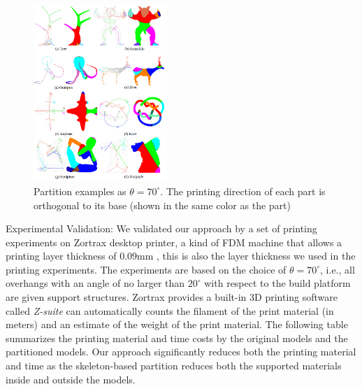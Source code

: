 \begin{figure}[tbp]
  \centering
  \includegraphics[width=0.45\textwidth]{figs/programming.png}
  \caption{\label{fig:programming}%
           Partition examples as $\theta = 70^{\circ}$. The printing direction of each part is orthogonal to its base (shown in the same color as the part)}
\end{figure}

Experimental Validation: We validated our approach by a set of printing experiments on Zortrax desktop printer, a kind of FDM machine that allows a printing layer thickness of 0.09mm , this is also the layer thickness we used in the printing experiments. The experiments are based on the choice of $\theta = 70^{\circ}$, i.e., all overhangs with an angle of no larger than $20^{\circ}$ with respect to the build platform are given support structures. Zortrax provides a built-in 3D printing software called \emph{Z-suite} can automatically counts the filament of the print material (in meters) and an estimate of the weight of the print material. The following table summarizes the printing material and time costs by the original models and the partitioned models. Our approach significantly reduces both the printing material and time as the skeleton-based partition reduces both the supported materials inside and outside the models.


